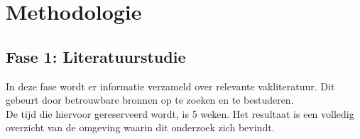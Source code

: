 
\chapter{Methodologie}%
\label{ch:methodologie}


\section{Fase 1: Literatuurstudie}
\label{sec:m-literatuurstudie}
In deze fase wordt er informatie verzameld over relevante vakliteratuur. Dit gebeurt door betrouwbare bronnen op te zoeken en te bestuderen. \\
De tijd die hiervoor gereserveerd wordt, is 5 weken. Het resultaat is een volledig overzicht van de omgeving waarin dit onderzoek zich bevindt. 




